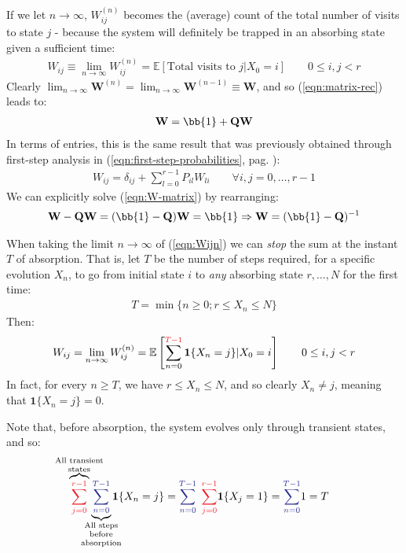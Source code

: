 \documentclass[../template.tex]{subfiles}
\begin{document}
If we let $n \to \infty$, $W_{ij}^{(n)}$ becomes the (average) count of the total number of visits to state $j$ - because the system will definitely be trapped in an absorbing state given a sufficient time:
\begin{align*}
    W_{ij} \equiv \lim_{n \to \infty} W_{ij}^{(n)} = \mathbb{E}[\text{Total visits to $j$}|X_0 = i] \qquad 0 \leq i, j < r
\end{align*}
Clearly $\lim_{n \to \infty} \textbf{W}^{(n)} = \lim_{n \to \infty} \textbf{W}^{(n-1)} \equiv \textbf{W}$, and so (\ref{eqn:matrix-rec}) leads to:
\begin{align}\label{eqn:W-matrix}
    \textbf{W} = \bb{1} + \textbf{QW}  
\end{align}
In terms of entries, this is the same result that was previously obtained through first-step analysis in (\ref{eqn:first-step-probabilities}, pag. \pageref{eqn:first-step-probabilities}):
\begin{align} \label{eqn:Wij-alt2}
    W_{ij} = \delta_{ij} + \sum_{l=0}^{r-1} P_{il} W_{li} \qquad \forall i, j = 0,\dots, r-1
\end{align}
We can explicitly solve (\ref{eqn:W-matrix}) by rearranging:
\begin{align*}
    \textbf{W} - \textbf{QW} = (\bb{1} - \textbf{Q}) \textbf{W} = \bb{1}  \Rightarrow \textbf{W} = (\bb{1} - \textbf{Q})^{-1}  
\end{align*}

\medskip

When taking the limit $n \to \infty$ of (\ref{eqn:Wijn}) we can \textit{stop} the sum at the instant $T$ of absorption. That is, let $T$ be the number of steps required, for a specific evolution $X_n$, to go from initial state $i$ to \textit{any} absorbing state $r,\dots, N$ for the first time:
\begin{align*}
    T = \min \{n \geq 0; r \leq X_n \leq N\}
\end{align*} 
Then:
\begin{align} \label{eqn:W-T}
    W_{ij} = \lim_{n \to \infty} W_{ij}^{(n)} = \mathbb{E}\left[\sum_{n=0}^{\textcolor{Red}{T-1}} \textbf{1}\{X_n=j\}|X_0 = i \right] \qquad 0 \leq i,j < r
\end{align}
In fact, for every $n \geq T$, we have $r \leq X_n \leq N$, and so clearly $X_n \neq j$, meaning that $\textbf{1}\{X_n = j\} = 0$.  

\medskip

Note that, before absorption, the system evolves only through transient states, and so:
\begin{align}
    \mathclap{\overbrace{\textcolor{Red}{\sum_{j=0}^{r-1}}}^{\parbox{5em}{\scriptsize \centering All transient states}}} \quad  \quad  \mathclap{\underbrace{\textcolor{Blue}{\sum_{n=0}^{T-1}}}_{\parbox{5em}{\centering \scriptsize All steps before absorption}}}\quad  \textbf{1}\{X_n = j\} = \textcolor{Blue}{\sum_{n=0}^{T-1}} \> \>\textcolor{Red}{\sum_{j=0}^{r-1}} \textbf{1}\{X_j = 1\} = \textcolor{Blue}{\sum_{n=0}^{T-1}} 1 = T \label{eqn:T-alt}
\end{align}
\end{document}
